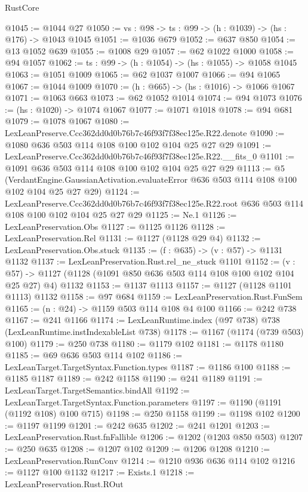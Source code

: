 \begin{lexlean}{RustCore}
\begin{coremodule}
@1045 := @1044 @27
@1050 := {vs : @98} -> {ts : @99} -> (h : @1039) -> (hs : @176) -> @1043 @1045
@1051 := @1036 @679
@1052 := @637 @850
@1054 := @13 @1052 @639
@1055 := @1008 @29
@1057 := @62 @1022 @1000
@1058 := @94 @1057
@1062 := {ts : @99} -> (h : @1054) -> (hs : @1055) -> @1058 @1045
@1063 := @1051 @1009
@1065 := @62 @1037 @1007
@1066 := @94 @1065
@1067 := @1044 @1009
@1070 := (h : @665) -> (hs : @1016) -> @1066 @1067
@1071 := @1063 @663
@1073 := @62 @1052 @1014
@1074 := @94 @1073
@1076 := (hs : @1020) -> @1074 @1067
@1077 := @1071 @1018
@1078 := @94 @681
@1079 := @1078 @1067
@1080 := LexLeanPreserve.Ccc362dd0d0b76b7c46f93f7f38ec125e.R22.denote
@1090 := @1080 @636 @503 @114 @108 @100 @102 @104 @25 @27 @29
@1091 := LexLeanPreserve.Ccc362dd0d0b76b7c46f93f7f38ec125e.R22.__fits_0
@1101 := @1091 @636 @503 @114 @108 @100 @102 @104 @25 @27 @29
@1113 := @5
    (VerdantEngine.GaussianActivation.evaluateError @636 @503 @114 @108 @100 @102 @104 @25 @27 @29)
@1124 := LexLeanPreserve.Ccc362dd0d0b76b7c46f93f7f38ec125e.R22.root
    @636
    @503
    @114
    @108
    @100
    @102
    @104
    @25
    @27
    @29
@1125 := Ne.{1}
@1126 := LexLeanPreservation.Obs
@1127 := @1125 @1126
@1128 := LexLeanPreservation.Rel
@1131 := @1127 (@1128 @29 @4)
@1132 := LexLeanPreservation.Obs.stuck
@1135 := (f : @635) -> (v : @57) -> @1131 @1132
@1137 := LexLeanPreservation.Rust.rel_ne_stuck @1101
@1152 := (v : @57) -> @1127 (@1128 (@1091 @850 @636 @503 @114 @108 @100 @102 @104 @25 @27) @4) @1132
@1153 := @1137 @1113
@1157 := @1127 (@1128 @1101 @1113) @1132
@1158 := @97 @684
@1159 := LexLeanPreservation.Rust.FunSem
@1165 := (n : @24) -> @1159 @503 @114 @108 @4 @100
@1166 := @242 @738
@1167 := @241 @1166
@1174 := LexLeanRuntime.index (@97 @738) @738 (LexLeanRuntime.instIndexableList @738)
@1178 := @1167 (@1174 (@739 @503) @100)
@1179 := @250 @738
@1180 := @1179 @102
@1181 := @1178 @1180
@1185 := @69 @636 @503 @114 @102
@1186 := LexLeanTarget.TargetSyntax.Function.types
@1187 := @1186 @100
@1188 := @1185 @1187
@1189 := @242 @1158
@1190 := @241 @1189
@1191 := LexLeanTarget.TargetSemantics.bindAll
@1192 := LexLeanTarget.TargetSyntax.Function.parameters
@1197 := @1190 (@1191 (@1192 @108) @100 @715)
@1198 := @250 @1158
@1199 := @1198 @102
@1200 := @1197 @1199
@1201 := @242 @635
@1202 := @241 @1201
@1203 := LexLeanPreservation.Rust.fnFallible
@1206 := @1202 (@1203 @850 @503)
@1207 := @250 @635
@1208 := @1207 @102
@1209 := @1206 @1208
@1210 := LexLeanPreservation.RunConv
@1214 := @1210 @936 @636 @114 @102
@1216 := @1127 @100 @1132
@1217 := Exists.{1}
@1218 := LexLeanPreservation.Rust.ROut

\end{coremodule}
\end{lexlean}
